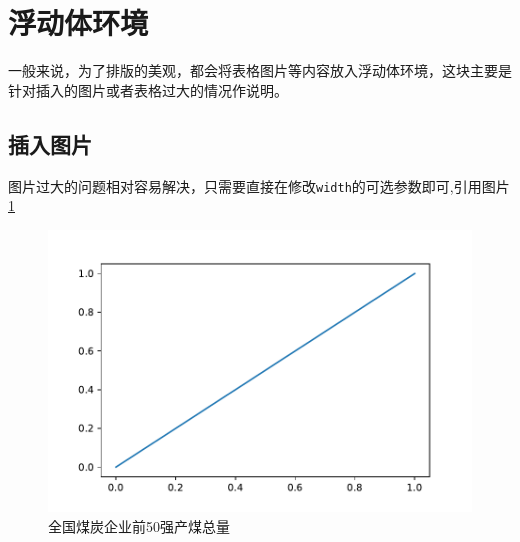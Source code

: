 \documentclass[withoutpreface,bwprint]{cumcmthesis} %
\begin{document}
\section{浮动体环境}
一般来说，为了排版的美观，都会将表格图片等内容放入浮动体环境，这块主要是针对插入的图片或者表格过大的情况作说明。
\subsection{插入图片}
图片过大的问题相对容易解决，只需要直接在修改\verb|width|的可选参数即可,引用图片\ref{sum_production}
\begin{figure}[H]%
  \small
  \centering
  \includegraphics[width=\textwidth]{./asset/figure.pdf}
  \caption{全国煤炭企业前50强产煤总量}\label{sum_production}
\end{figure}
\end{document}
